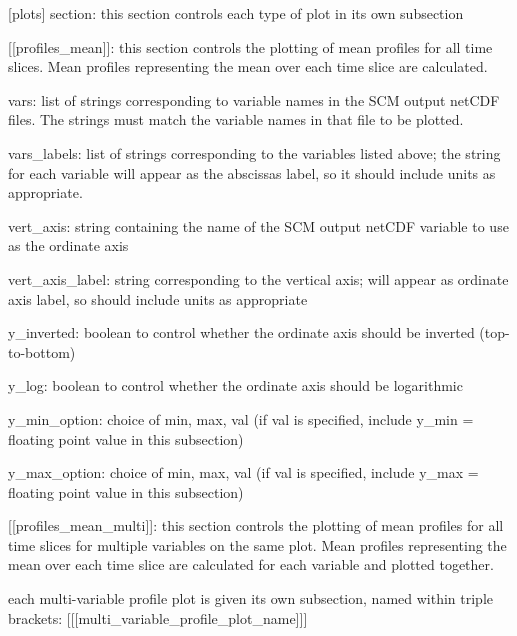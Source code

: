 \begin{DoxyItemize}
\begin{DoxyItemize}
\begin{DoxyItemize}
\begin{DoxyItemize}
\begin{DoxyItemize}
\end{DoxyItemize}
\end{DoxyItemize}
\item \mbox{[}plots\mbox{]} section\+: this section controls each type of plot in its own subsection
\begin{DoxyItemize}
\item \mbox{[}\mbox{[}profiles\+\_\+mean\mbox{]}\mbox{]}\+: this section controls the plotting of mean profiles for all time slices. Mean profiles representing the mean over each time slice are calculated.
\begin{DoxyItemize}
\item vars\+: list of strings corresponding to variable names in the S\+CM output net\+C\+DF files. The strings must match the variable names in that file to be plotted.
\item vars\+\_\+labels\+: list of strings corresponding to the variables listed above; the string for each variable will appear as the abscissa\textquotesingle{}s label, so it should include units as appropriate.
\item vert\+\_\+axis\+: string containing the name of the S\+CM output net\+C\+DF variable to use as the ordinate axis
\item vert\+\_\+axis\+\_\+label\+: string corresponding to the vertical axis; will appear as ordinate axis label, so should include units as appropriate
\item y\+\_\+inverted\+: boolean to control whether the ordinate axis should be inverted (top-\/to-\/bottom)
\item y\+\_\+log\+: boolean to control whether the ordinate axis should be logarithmic
\item y\+\_\+min\+\_\+option\+: choice of min, max, val (if val is specified, include y\+\_\+min = floating point value in this subsection)
\item y\+\_\+max\+\_\+option\+: choice of min, max, val (if val is specified, include y\+\_\+max = floating point value in this subsection) 
\end{DoxyItemize}
\item \mbox{[}\mbox{[}profiles\+\_\+mean\+\_\+multi\mbox{]}\mbox{]}\+: this section controls the plotting of mean profiles for all time slices for multiple variables on the same plot. Mean profiles representing the mean over each time slice are calculated for each variable and plotted together.
\begin{DoxyItemize}
\item each multi-\/variable profile plot is given its own subsection, named within triple brackets\+: \mbox{[}\mbox{[}\mbox{[}multi\+\_\+variable\+\_\+profile\+\_\+plot\+\_\+name\mbox{]}\mbox{]}\mbox{]}

\end{DoxyItemize}
\end{DoxyItemize}
\end{DoxyItemize}
\end{DoxyItemize}
\end{DoxyItemize}
